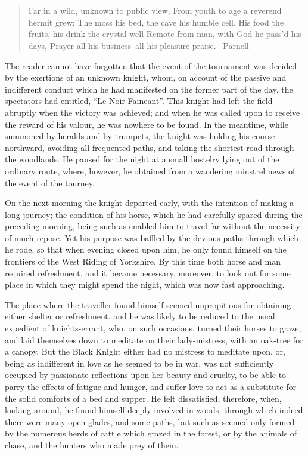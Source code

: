 \chapter{}

\begin{quote}
Far in a wild, unknown to public view,
From youth to age a reverend hermit grew;
The moss his bed, the cave his humble cell,
His food the fruits, his drink the crystal well
Remote from man, with God he pass'd his days,
Prayer all his business--all his pleasure praise.
--Parnell
\end{quote}

The reader cannot have forgotten that the event of the tournament was
decided by the exertions of an unknown knight, whom, on account of the
passive and indifferent conduct which he had manifested on the former
part of the day, the spectators had entitled, ``Le Noir Faineant''. This
knight had left the field abruptly when the victory was achieved; and
when he was called upon to receive the reward of his valour, he was
nowhere to be found. In the meantime, while summoned by heralds and by
trumpets, the knight was holding his course northward, avoiding all
frequented paths, and taking the shortest road through the woodlands. He
paused for the night at a small hostelry lying out of the ordinary
route, where, however, he obtained from a wandering minstrel news of the
event of the tourney.

On the next morning the knight departed early, with the intention of
making a long journey; the condition of his horse, which he had
carefully spared during the preceding morning, being such as enabled him
to travel far without the necessity of much repose. Yet his purpose was
baffled by the devious paths through which he rode, so that when evening
closed upon him, he only found himself on the frontiers of the West
Riding of Yorkshire. By this time both horse and man required
refreshment, and it became necessary, moreover, to look out for some
place in which they might spend the night, which was now fast
approaching.

The place where the traveller found himself seemed unpropitious for
obtaining either shelter or refreshment, and he was likely to be reduced
to the usual expedient of knights-errant, who, on such occasions, turned
their horses to graze, and laid themselves down to meditate on their
lady-mistress, with an oak-tree for a canopy. But the Black Knight
either had no mistress to meditate upon, or, being as indifferent in
love as he seemed to be in war, was not sufficiently occupied by
passionate reflections upon her beauty and cruelty, to be able to parry
the effects of fatigue and hunger, and suffer love to act as a
substitute for the solid comforts of a bed and supper. He felt
dissatisfied, therefore, when, looking around, he found himself deeply
involved in woods, through which indeed there were many open glades, and
some paths, but such as seemed only formed by the numerous herds of
cattle which grazed in the forest, or by the animals of chase, and the
hunters who made prey of them.

